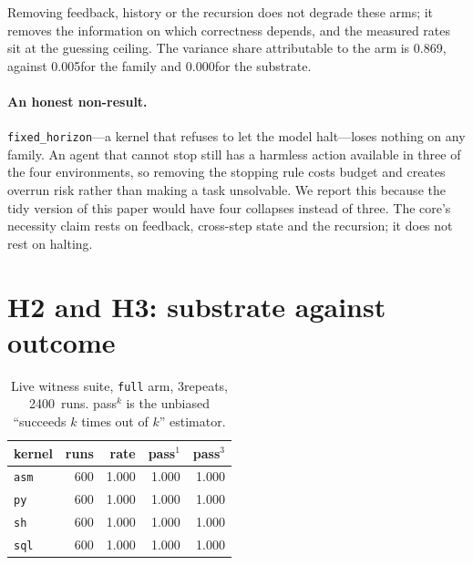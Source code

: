 \documentclass[11pt,a4paper]{article}
\begin{document}
Removing feedback, history or the recursion does not degrade these arms; it
removes the information on which correctness depends, and the measured rates
sit at the guessing ceiling. The variance share attributable to the arm is
0.869, against 0.005for the family and
0.000for the substrate.

\paragraph{An honest non-result.}
\texttt{fixed\_horizon}---a kernel that refuses to let the model halt---loses
nothing on any family. An agent that cannot stop still has a harmless action
available in three of the four environments, so removing the stopping rule
costs budget and creates overrun risk rather than making a task unsolvable. We
report this because the tidy version of this paper would have four collapses
instead of three. The core's necessity claim rests on feedback, cross-step
state and the recursion; it does not rest on halting.

\section{H2 and H3: substrate against outcome}
\label{sec:h2}

\begin{table}[h]\centering\small
\caption{Live witness suite, \texttt{full} arm, 3repeats, 2400\
runs. pass$^k$ is the unbiased ``succeeds $k$ times out of $k$'' estimator.}
\label{tab:subpassk}
\begin{tabular}{lrrrr}
\toprule
kernel & runs & rate & pass$^1$ & pass$^3$ \\
\midrule
\texttt{asm} & 600 & 1.000 & 1.000 & 1.000 \\
\texttt{py} & 600 & 1.000 & 1.000 & 1.000 \\
\texttt{sh} & 600 & 1.000 & 1.000 & 1.000 \\
\texttt{sql} & 600 & 1.000 & 1.000 & 1.000 \\
\bottomrule
\end{tabular}
\end{table}
\end{document}
